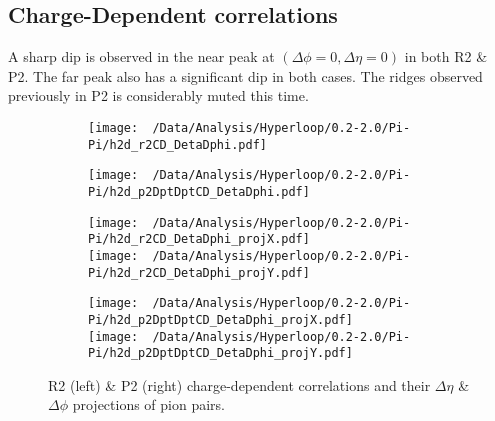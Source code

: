 \documentclass[12pt,a4paper,twoside]{report}
\begin{document}
\subsection{Charge-Dependent correlations}
A sharp dip is observed in the near peak at $(\Delta\phi=0,\Delta\eta=0)$ in both R2 \& P2. The far peak also has a significant dip in both cases. The ridges observed previously in P2 is considerably muted this time.
\begin{figure}[H]
	\begin{subfigure}{0.49\linewidth}
		\texttt{[image: ~/Data/Analysis/Hyperloop/0.2-2.0/Pi-Pi/h2d\_r2CD\_DetaDphi.pdf]}\\
	\end{subfigure}
	\begin{subfigure}{0.49\linewidth}
		\texttt{[image: ~/Data/Analysis/Hyperloop/0.2-2.0/Pi-Pi/h2d\_p2DptDptCD\_DetaDphi.pdf]}\\
	\end{subfigure}
\end{figure}
\begin{figure}[H]
	\ContinuedFloat
	\begin{subfigure}{0.49\linewidth}
		\texttt{[image: ~/Data/Analysis/Hyperloop/0.2-2.0/Pi-Pi/h2d\_r2CD\_DetaDphi\_projX.pdf]}\\
		\texttt{[image: ~/Data/Analysis/Hyperloop/0.2-2.0/Pi-Pi/h2d\_r2CD\_DetaDphi\_projY.pdf]}\\
	\end{subfigure}
	\begin{subfigure}{0.49\linewidth}
		\texttt{[image: ~/Data/Analysis/Hyperloop/0.2-2.0/Pi-Pi/h2d\_p2DptDptCD\_DetaDphi\_projX.pdf]}\\
		\texttt{[image: ~/Data/Analysis/Hyperloop/0.2-2.0/Pi-Pi/h2d\_p2DptDptCD\_DetaDphi\_projY.pdf]}\\
	\end{subfigure}
	\caption{R2 (left) \& P2 (right) charge-dependent correlations and their $\Delta\eta$ \& $\Delta\phi$ projections of pion pairs.}
\end{figure}
\end{document}
